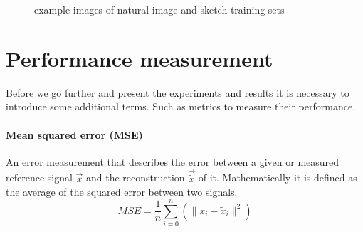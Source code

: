 \begin{figure}[h]
\hspace{5mm}
\hspace{5mm}
\hspace{5mm}
\hspace{5mm}
\caption{example images of natural image and sketch training sets}
\label{fig:database_images}
\end{figure}

\section{Performance measurement}
Before we go further and present the experiments and results it is necessary to
introduce some additional terms. Such as metrics to measure their performance.

\paragraph{Mean squared error (MSE)}  An error measurement that
describes the error between a given or measured reference signal $\vec{x}$
and the reconstruction $\vec{\tilde{x}}$ of it. Mathematically it is defined as
the average of the squared error between two signals.
\begin{equation*}
 MSE = \frac{1}{n} \sum_{i=0}^{n} \left( {\lVert x_i -
\tilde{x}_i\rVert^{2}}\right)
\end{equation*}

